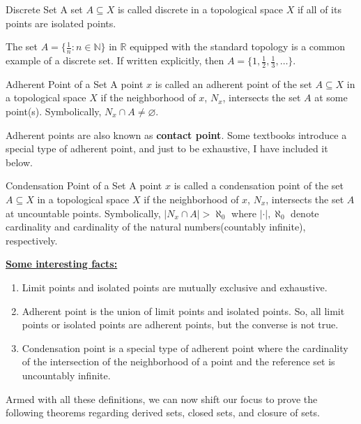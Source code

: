 \begin{Definition}{Discrete Set}\label{discrete_set_topology}
    A set $A\subseteq X$ is called discrete in a topological space $X$ if all of its points are isolated points.
\end{Definition}
\begin{Example}\label{discrete_set_example}
    The set $A=\{\frac{1}{n}:n\in\mathbb{N}\}$ in $\mathbb{R}$ equipped with the standard topology is a common example of a discrete set. If written explicitly, then $A=\{1, \frac{1}{2},\frac{1}{3},\dots\}$.
\end{Example}
\begin{Definition}{Adherent Point of a Set}\label{adherent_point}
    A point $x$ is called an adherent point of the set $A\subseteq X$ in a topological space $X$ if the neighborhood of $x$, $N_x$, intersects the set $A$ at some point(s). Symbolically, $N_x\cap A\neq\varnothing$.
\end{Definition}
\noindent Adherent points are also known as \textbf{contact point}. Some textbooks introduce a special type of adherent point, and just to be exhaustive, I have included it below.
\begin{Definition}{Condensation Point of a Set}\label{condensation_point}
    A point $x$ is called a condensation point of the set $A\subseteq X$ in a topological space $X$ if the neighborhood of $x$, $N_x$, intersects the set $A$ at uncountable points. Symbolically, $|N_x\cap A|>\aleph_0$ where $|\cdot|, \aleph_0$ denote cardinality and cardinality of the natural numbers(countably infinite), respectively.
\end{Definition}
\noindent \textbf{\underline{Some interesting facts:}}
\begin{enumerate}
    \item Limit points and isolated points are mutually exclusive and exhaustive.
    \item Adherent point is the union of limit points and isolated points. So, all limit points or isolated points are adherent points, but the converse is not true.
    \item Condensation point is a special type of adherent point where the cardinality of the intersection of the neighborhood of a point and the reference set is uncountably infinite.
\end{enumerate}
Armed with all these definitions, we can now shift our focus to prove the following theorems regarding derived sets, closed sets, and closure of sets.
